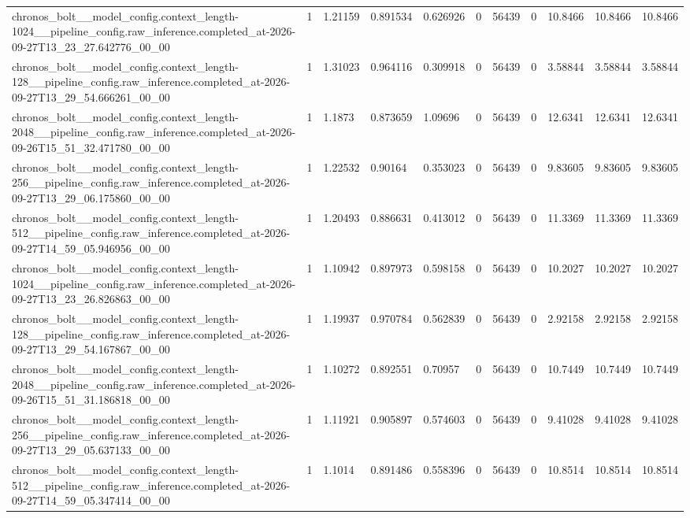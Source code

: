 \begin{tabular}{lllllllllll}
chronos\_bolt\_\_model\_config.context\_length-1024\_\_pipeline\_config.raw\_inference.completed\_at-2026-09-27T13\_23\_27.642776\_00\_00 & 1 & 1.21159 & 0.891534 & 0.626926 & 0 & 56439 & 0 & 10.8466 & 10.8466 & 10.8466 \\
chronos\_bolt\_\_model\_config.context\_length-128\_\_pipeline\_config.raw\_inference.completed\_at-2026-09-27T13\_29\_54.666261\_00\_00 & 1 & 1.31023 & 0.964116 & 0.309918 & 0 & 56439 & 0 & 3.58844 & 3.58844 & 3.58844 \\
chronos\_bolt\_\_model\_config.context\_length-2048\_\_pipeline\_config.raw\_inference.completed\_at-2026-09-26T15\_51\_32.471780\_00\_00 & 1 & 1.1873 & 0.873659 & 1.09696 & 0 & 56439 & 0 & 12.6341 & 12.6341 & 12.6341 \\
chronos\_bolt\_\_model\_config.context\_length-256\_\_pipeline\_config.raw\_inference.completed\_at-2026-09-27T13\_29\_06.175860\_00\_00 & 1 & 1.22532 & 0.90164 & 0.353023 & 0 & 56439 & 0 & 9.83605 & 9.83605 & 9.83605 \\
chronos\_bolt\_\_model\_config.context\_length-512\_\_pipeline\_config.raw\_inference.completed\_at-2026-09-27T14\_59\_05.946956\_00\_00 & 1 & 1.20493 & 0.886631 & 0.413012 & 0 & 56439 & 0 & 11.3369 & 11.3369 & 11.3369 \\
chronos\_bolt\_\_model\_config.context\_length-1024\_\_pipeline\_config.raw\_inference.completed\_at-2026-09-27T13\_23\_26.826863\_00\_00 & 1 & 1.10942 & 0.897973 & 0.598158 & 0 & 56439 & 0 & 10.2027 & 10.2027 & 10.2027 \\
chronos\_bolt\_\_model\_config.context\_length-128\_\_pipeline\_config.raw\_inference.completed\_at-2026-09-27T13\_29\_54.167867\_00\_00 & 1 & 1.19937 & 0.970784 & 0.562839 & 0 & 56439 & 0 & 2.92158 & 2.92158 & 2.92158 \\
chronos\_bolt\_\_model\_config.context\_length-2048\_\_pipeline\_config.raw\_inference.completed\_at-2026-09-26T15\_51\_31.186818\_00\_00 & 1 & 1.10272 & 0.892551 & 0.70957 & 0 & 56439 & 0 & 10.7449 & 10.7449 & 10.7449 \\
chronos\_bolt\_\_model\_config.context\_length-256\_\_pipeline\_config.raw\_inference.completed\_at-2026-09-27T13\_29\_05.637133\_00\_00 & 1 & 1.11921 & 0.905897 & 0.574603 & 0 & 56439 & 0 & 9.41028 & 9.41028 & 9.41028 \\
chronos\_bolt\_\_model\_config.context\_length-512\_\_pipeline\_config.raw\_inference.completed\_at-2026-09-27T14\_59\_05.347414\_00\_00 & 1 & 1.1014 & 0.891486 & 0.558396 & 0 & 56439 & 0 & 10.8514 & 10.8514 & 10.8514 \\

\end{tabular}
